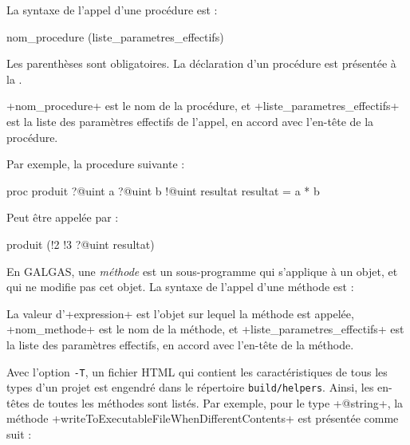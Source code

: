 
La syntaxe de l'appel d'une procédure est :
\begin{galgasbox}
nom_procedure (liste_parametres_effectifs)
\end{galgasbox}

Les parenthèses sont obligatoires. La déclaration d'un procédure est présentée à la .

\ggs+nom_procedure+ est le nom de la procédure, et \ggs+liste_parametres_effectifs+ est la liste des paramètres effectifs de l'appel, en accord avec l'en-tête de la procédure.

Par exemple, la procedure suivante :
\begin{galgas}
proc produit ?@uint a ?@uint b !@uint resultat {
  resultat = a * b
}
\end{galgas}

Peut être appelée par :
\begin{galgas}
produit (!2 !3 ?@uint resultat)
\end{galgas}
















En GALGAS, une \emph{méthode} est un sous-programme qui s'applique à un objet, et qui ne modifie pas cet objet. La syntaxe de l'appel d'une méthode est :
\begin{galgas}
\end{galgas}

La valeur d'\ggs+expression+ est l'objet sur lequel la méthode est appelée, \ggs+nom_methode+ est le nom de la méthode, et \ggs+liste_parametres_effectifs+ est la liste des paramètres effectifs, en accord avec l'en-tête de la méthode.

Avec l'option \texttt{-T}, un fichier HTML qui contient les caractéristiques de tous les types d'un projet est engendré dans le répertoire \texttt{build/helpers}. Ainsi, les en-têtes de toutes les méthodes sont listés. Par exemple, pour le type \ggs+@string+, la méthode \ggs+writeToExecutableFileWhenDifferentContents+ est présentée comme suit :

